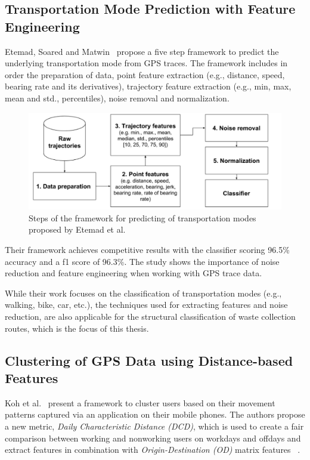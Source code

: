 \documentclass[a4paper,12pt,twoside]{scrreprt}
\begin{document}
\subsection{Transportation Mode Prediction with Feature Engineering}
Etemad, Soared and Matwin~\cite{etemad_predicting_2018} propose a five step
framework to predict the
underlying transportation mode from GPS traces. The framework
includes in order the preparation of data, point feature extraction (e.g.,
distance, speed, bearing rate and its derivatives), trajectory feature
extraction (e.g., min, max, mean and std., percentiles), noise removal and
normalization.

\begin{figure}[htbp]
  \centering
  \includegraphics[width=\textwidth]{Figures/related_work/etemad_pipeline.png}
  \caption{Steps of the framework for predicting of transportation
    modes proposed by Etemad et al.~\cite{etemad_predicting_2018}}
  \label{fig:etemad_framework_prediction}
\end{figure}
\FloatBarrier

Their framework achieves competitive results with the
classifier scoring 96.5\% accuracy and a f1 score of 96.3\%. The study shows
the
importance of noise reduction and feature engineering when working with GPS
trace data.~\cite{etemad_predicting_2018}

While their work focuses on the classification of transportation modes (e.g.,
walking, bike, car, etc.), the techniques used for extracting features and
noise reduction, are also applicable for the structural classification of waste
collection routes, which is the focus of this thesis.

\subsection{Clustering of GPS Data using Distance-based Features}
Koh et al.~\cite{koh_clustering_2022} present a framework to cluster users
based on their movement patterns captured via an application on their mobile
phones.
The authors propose a new metric, \textit{Daily Characteristic Distance
  (DCD)},
which is used to create a fair comparison between working and nonworking users
on workdays and offdays and extract features in combination with
\textit{Origin-Destination (OD)} matrix features ~\cite{koh_clustering_2022}.
\end{document}
